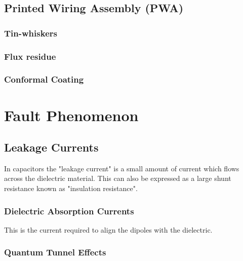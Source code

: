 \documentclass{article}
\begin{document}
\subsection{Printed Wiring Assembly (PWA)}
	\subsubsection{Tin-whiskers}
	\subsubsection{Flux residue}
	\subsubsection{Conformal Coating}
	
	
\newpage

\section{Fault Phenomenon}
\subsection{Leakage Currents}
In capacitors the "leakage current" is a small amount of current which flows across the dielectric material. This can also be expressed as a large shunt resistance known as "insulation resistance".
\subsubsection{Dielectric Absorption Currents}
This is the current required to align the dipoles with the dielectric.
\subsubsection{Quantum Tunnel Effects}


\newpage

\printbibliography
\end{document}
